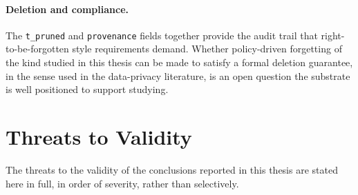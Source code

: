 \paragraph{Deletion and compliance.} The \texttt{t\_pruned} and \texttt{provenance} fields together provide the audit trail that right-to-be-forgotten style requirements demand. Whether policy-driven forgetting of the kind studied in this thesis can be made to satisfy a formal deletion guarantee, in the sense used in the data-privacy literature, is an open question the substrate is well positioned to support studying.

\section{Threats to Validity}
\label{sec:threats}

The threats to the validity of the conclusions reported in this thesis are stated here in full, in order of severity, rather than selectively.

